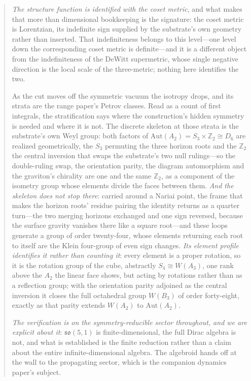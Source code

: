 \documentclass[11pt,a4paper]{article}
\theoremstyle{plain}
\theoremstyle{definition}
\theoremstyle{remark}
\newcommand{\so}{\mathfrak{so}}
\begin{document}
\begin{abstract}
\emph{The structure function is identified with the coset metric}, and what makes that more than dimensional bookkeeping is the signature: the coset metric is Lorentzian, its indefinite sign supplied by the substrate's own geometry rather than inserted. That indefiniteness belongs to this level---one level down the corresponding coset metric is definite---and it is a different object from the indefiniteness of the DeWitt supermetric, whose single negative direction is the local scale of the three-metric; nothing here identifies the two.

As the cut moves off the symmetric vacuum the isotropy drops, and its strata are the range paper's Petrov classes. Read as a count of first integrals, the stratification says where the construction's hidden symmetry is needed and where it is not. The discrete skeleton at those strata is the substrate's own Weyl group: both factors of $\mathrm{Aut}(A_2)=S_3\times\mathbb{Z}_2\cong D_6$ are realized geometrically, the $S_3$ permuting the three horizon roots and the $\mathbb{Z}_2$ the central inversion that swaps the substrate's two null rulings---so the double-ruling swap, the orientation parity, the diagram automorphism and the graviton's chirality are one and the same $\mathbb{Z}_2$, as a component of the isometry group whose elements divide the faces between them. \emph{And the skeleton does not stop there}: carried around a Nariai point, the frame that makes the horizon roots' residue pairing the identity returns as a quarter turn---the two merging horizons exchanged and one sign reversed, because the surface gravity vanishes there like a square root---and these loops generate a group of order twenty-four, whose elements returning each root to itself are the Klein four-group of even sign changes. \emph{Its element profile identifies it rather than counting it}: every element is a proper rotation, so it is the rotation group of the cube, abstractly $S_4\cong W(A_3)$, one rank above the $A_2$ the linear face shows, but acting by rotations rather than as a reflection group; with the orientation parity adjoined as the central inversion it closes the full octahedral group $W(B_3)$ of order forty-eight, exactly as that parity extends $W(A_2)$ to $\mathrm{Aut}(A_2)$.

\emph{The verification is on the symmetry-reducible sector throughout, and we are explicit about it}: $\so(5,1)$ is finite-dimensional, the full Dirac algebra is not, and what is established is the finite reduction rather than a claim about the entire infinite-dimensional algebra. The algebroid hands off at the wall to the propagating sector, which is the companion dynamics paper's subject.
\end{abstract}
\end{document}
